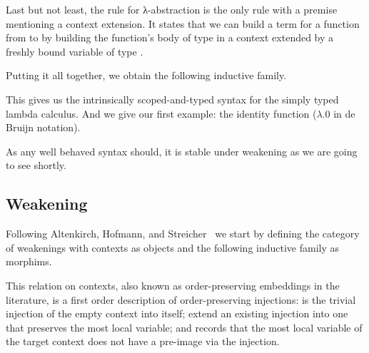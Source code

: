 \documentclass{article}
\begin{document}
Last but not least, the rule for λ-abstraction is the only rule
with a premise mentioning a context extension. It states that
we can build a term for a function from  to  by
building the function's body of type  in a context extended
by a freshly bound variable of type .

\noindent
\begin{minipage}[t]{.5\textwidth}
\end{minipage}\hfill
\begin{minipage}[t]{.35\textwidth}
\begin{mathpar}
\end{mathpar}
\end{minipage}

Putting it all together, we obtain the following inductive family.

\begin{AgdaAlign}
\begin{AgdaSuppressSpace}
\end{AgdaSuppressSpace}
\end{AgdaAlign}

This gives us the intrinsically scoped-and-typed syntax for
the simply typed lambda calculus.
And we give our first example: the identity function ($λ.0$ in de Bruijn notation).



As any well behaved syntax should,
it is stable under weakening as we are going to see shortly.

\subsection{Weakening}

Following Altenkirch, Hofmann, and Streicher~\cite{DBLP:conf/ctcs/AltenkirchHS95}
we start by defining the category of weakenings with contexts
as objects and the following inductive family as morphims.


This relation on contexts, also known as order-preserving embeddings in the
literature, is a first order description of order-preserving
injections:
 is the trivial injection of the empty context into
itself;
 extend an existing injection into one that preserves
the most local variable;
and  records that the most local variable of the target
context does not have a pre-image via the injection.
\end{document}
